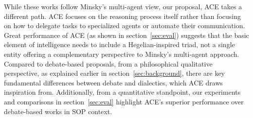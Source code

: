While these works follow Minsky’s multi-agent view, our proposal, ACE takes a different path. ACE focuses on the reasoning process itself rather than focusing on how to delegate tasks to specialized agents or automate their communication. Great performance of ACE (as shown in section~\ref{sec:eval}) suggests that the basic element of intelligence needs to include a Hegelian-inspired triad, not a single entity offering a complementary perspective to Minsky’s multi-agent approach. Compared to debate-based proposals, from a philosophical qualitative perspective, as explained earlier in section~\ref{sec:background}, there are key fundamental differences between debate and dialectics, which ACE draws inspiration from. Additionally, from a quantitative standpoint, our experiments and comparisons in section~\ref{sec:eval} highlight ACE's superior performance over debate-based works in SOP context.